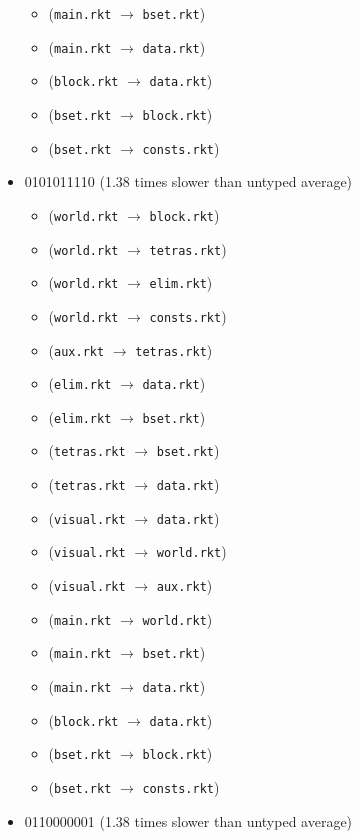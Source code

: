 \documentclass{article}
\newcommand{\mono}[1]{\texttt{#1}}
\begin{document}
\begin{itemize}
\begin{itemize}
  \item (\mono{main.rkt} $\rightarrow$ \mono{bset.rkt})
  \item (\mono{main.rkt} $\rightarrow$ \mono{data.rkt})
  \item (\mono{block.rkt} $\rightarrow$ \mono{data.rkt})
  \item (\mono{bset.rkt} $\rightarrow$ \mono{block.rkt})
  \item (\mono{bset.rkt} $\rightarrow$ \mono{consts.rkt})
  \end{itemize}
\item 0101011110 (1.38 times slower than untyped average)
  \begin{itemize}
  \item (\mono{world.rkt} $\rightarrow$ \mono{block.rkt})
  \item (\mono{world.rkt} $\rightarrow$ \mono{tetras.rkt})
  \item (\mono{world.rkt} $\rightarrow$ \mono{elim.rkt})
  \item (\mono{world.rkt} $\rightarrow$ \mono{consts.rkt})
  \item (\mono{aux.rkt} $\rightarrow$ \mono{tetras.rkt})
  \item (\mono{elim.rkt} $\rightarrow$ \mono{data.rkt})
  \item (\mono{elim.rkt} $\rightarrow$ \mono{bset.rkt})
  \item (\mono{tetras.rkt} $\rightarrow$ \mono{bset.rkt})
  \item (\mono{tetras.rkt} $\rightarrow$ \mono{data.rkt})
  \item (\mono{visual.rkt} $\rightarrow$ \mono{data.rkt})
  \item (\mono{visual.rkt} $\rightarrow$ \mono{world.rkt})
  \item (\mono{visual.rkt} $\rightarrow$ \mono{aux.rkt})
  \item (\mono{main.rkt} $\rightarrow$ \mono{world.rkt})
  \item (\mono{main.rkt} $\rightarrow$ \mono{bset.rkt})
  \item (\mono{main.rkt} $\rightarrow$ \mono{data.rkt})
  \item (\mono{block.rkt} $\rightarrow$ \mono{data.rkt})
  \item (\mono{bset.rkt} $\rightarrow$ \mono{block.rkt})
  \item (\mono{bset.rkt} $\rightarrow$ \mono{consts.rkt})
  \end{itemize}
\item 0110000001 (1.38 times slower than untyped average)

\end{itemize}
\end{document}

